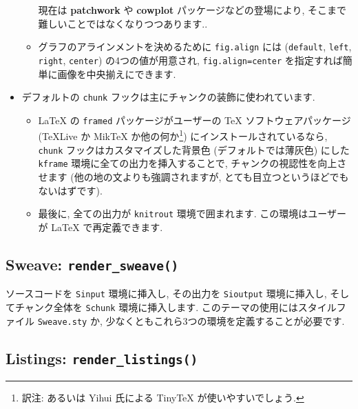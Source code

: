 \documentclass[
  lualatex,ja=standard,jafont=noto-otf]{bxjsreport}
\providecommand{\tightlist}{%
  \setlength{\itemsep}{0pt}\setlength{\parskip}{0pt}}
\begin{document}
\begin{itemize}
\begin{itemize}
{      現在は \textbf{patchwork} や \textbf{cowplot}
      パッケージなどの登場により,
      そこまで難しいことではなくなりつつあります.}.
  \item
    グラフのアラインメントを決めるために \texttt{fig.align} には
    (\texttt{default}, \texttt{left}, \texttt{right}, \texttt{center})
    の4つの値が用意され,
    \texttt{fig.align=\textquotesingle{}center\textquotesingle{}}
    を指定すれば簡単に画像を中央揃えにできます.
  \end{itemize}
\item
  デフォルトの \texttt{chunk}
  フックは主にチャンクの装飾に使われています.

  \begin{itemize}
  \tightlist
  \item
    LaTeX の \texttt{framed} パッケージがユーザーの TeX
    ソフトウェアパッケージ (TeXLive か MikTeX か他の何か\footnote{訳注:
      あるいは Yihui 氏による TinyTeX が使いやすいでしょう.})
    にインストールされているなら, \texttt{chunk}
    フックはカスタマイズした背景色 (デフォルトでは薄灰色) にした
    \texttt{kframe} 環境に全ての出力を挿入することで,
    チャンクの視認性を向上させます (他の地の文よりも強調されますが,
    とても目立つというほどでもないはずです).
  \item
    最後に, 全ての出力が \texttt{knitrout} 環境で囲まれます.
    この環境はユーザーが LaTeX で再定義できます.
  \end{itemize}
\end{itemize}

\hypertarget{sweave-render_sweave}{%
\subsection{\texorpdfstring{Sweave:
\texttt{render\_sweave()}}{Sweave: render\_sweave()}}\label{sweave-render_sweave}}

ソースコードを \texttt{Sinput} 環境に挿入し, その出力を
\texttt{Sioutput} 環境に挿入し, そしてチャンク全体を \texttt{Schunk}
環境に挿入します. このテーマの使用にはスタイルファイル
\texttt{Sweave.sty} か,
少なくともこれら3つの環境を定義することが必要です.

\hypertarget{listings-render_listings}{%
\subsection{\texorpdfstring{Listings:
\texttt{render\_listings()}}{Listings: render\_listings()}}\label{listings-render_listings}}
\end{document}

